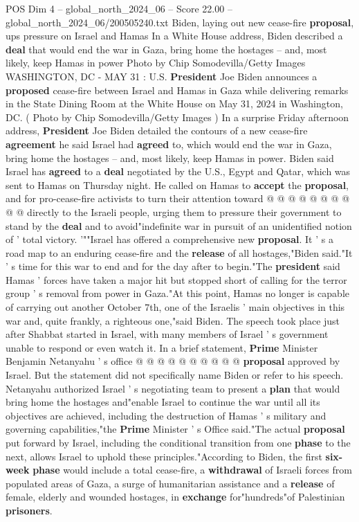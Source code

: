 \begin{textsample}{POS Dim 4 – global\_north\_2024\_06 – Score 22.00 – global\_north\_2024\_06/200505240.txt}  \label{ex:f4_pos_140}
Biden, laying out new cease-fire \textbf{proposal}, ups pressure on Israel and Hamas In a White House address, Biden described a \textbf{deal} that would end the war in Gaza, bring home the hostages -- and, most likely, keep Hamas in power Photo by Chip Somodevilla/Getty Images WASHINGTON, DC - MAY 31 : U.S. \textbf{President} Joe Biden announces a \textbf{proposed} cease-fire between Israel and Hamas in Gaza while delivering remarks in the State Dining Room at the White House on May 31, 2024 in Washington, DC. ( Photo by Chip Somodevilla/Getty Images ) In a surprise Friday afternoon address, \textbf{President} Joe Biden detailed the contours of a new cease-fire \textbf{agreement} he said Israel had \textbf{agreed} to, which would end the war in Gaza, bring home the hostages -- and, most likely, keep Hamas in power.
Biden said Israel has \textbf{agreed} to a \textbf{deal} negotiated by the U.S., Egypt and Qatar, which was sent to Hamas on Thursday night.
He called on Hamas to \textbf{accept} the \textbf{proposal}, and for pro-cease-fire activists to turn their attention toward @ @ @ @ @ @ @ @ @ @ directly to the Israeli people, urging them to pressure their government to stand by the \textbf{deal} and to avoid"indefinite war in pursuit of an unidentified notion of ' total victory. '""Israel has offered a comprehensive new \textbf{proposal}.
It ' s a road map to an enduring cease-fire and the \textbf{release} of all hostages,"Biden said."It ' s time for this war to end and for the day after to begin."The \textbf{president} said Hamas ' forces have taken a major hit but stopped short of calling for the terror group ' s removal from power in Gaza."At this point, Hamas no longer is capable of carrying out another October 7th, one of the Israelis ' main objectives in this war and, quite frankly, a righteous one,"said Biden.
The speech took place just after Shabbat started in Israel, with many members of Israel ' s government unable to respond or even watch it.
In a brief statement, \textbf{Prime} Minister Benjamin Netanyahu ' s office @ @ @ @ @ @ @ @ @ @ \textbf{proposal} approved by Israel.
But the statement did not specifically name Biden or refer to his speech.
Netanyahu authorized Israel ' s negotiating team to present a \textbf{plan} that would bring home the hostages and"enable Israel to continue the war until all its objectives are achieved, including the destruction of Hamas ' s military and governing capabilities,"the \textbf{Prime} Minister ' s Office said."The actual \textbf{proposal} put forward by Israel, including the conditional transition from one \textbf{phase} to the next, allows Israel to uphold these principles."According to Biden, the first \textbf{six-week} \textbf{phase} would include a total cease-fire, a \textbf{withdrawal} of Israeli forces from populated areas of Gaza, a surge of humanitarian assistance and a \textbf{release} of female, elderly and wounded hostages, in \textbf{exchange} for"hundreds"of Palestinian \textbf{prisoners}.

\end{textsample}
